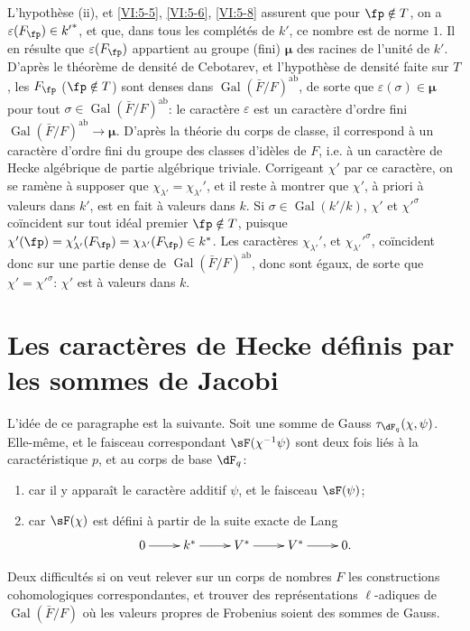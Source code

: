 \documentclass[oneside]{book}
\DeclareMathOperator{\gal}{Gal}
\newcommand{\dmu}{{\bm\mu}}
\theoremstyle{sga-source}
\theoremstyle{sga-source-dash}
\theoremstyle{sga-source-dotdash}
\theoremstyle{sga-source-number-note-dash}
\theoremstyle{sga-source-note-number-dotdash}
\theoremstyle{sga-source-example-dotdash}
\theoremstyle{sga-source-inline-number}
\theoremstyle{sga-source-bare-number}
\theoremstyle{sga-source}
\newcommand{\PrintPage}[1]{}\newcommand{\MathPage}[1]{}\newcommand{\PrintCite}[2]{#1}\newcommand{\var}[3]{#2}
\begin{document}
L'hypothèse (ii), et \ref{VI:5-5}, \ref{VI:5-6}, \ref{VI:5-8} assurent que 
pour $\fp\notin T$, on a $\varepsilon(F_\fp)\in {k'}^\ast$, et que, dans tous 
les complétés de $k'$, ce nombre est de norme $1$. Il en résulte que 
$\varepsilon(F_\fp)$ appartient au \var{groupe (fini) $\dmu$ racines}{groupe (fini) $\dmu$ des racines}{S45-SOL-0884} de l'unité 
de $k'$. D'après le théorème de densité de Cebotarev, et l'hypothèse 
de densité faite sur $T$, les $F_\fp$ ($\fp\notin T$) sont denses dans 
$\gal(\bar F/F)^\text{ab}$, de sorte que $\varepsilon(\sigma)\in \dmu$ pour tout 
$\sigma\in \gal(\bar F/F)^\text{ab}$: le caractère $\varepsilon$ est un 
caractère d'ordre fini $\gal(\bar F/F)^\text{ab}\to \dmu$. D'après la 
théorie du corps de classe, il correspond à un caractère d'ordre fini 
du groupe des classes d'idèles de $F$, i.e. à un caractère de Hecke 
algébrique de partie algébrique triviale. Corrigeant $\chi'$ par ce 
caractère, on se ramène à supposer que 
$\chi_{\lambda'}=\chi_{\lambda'}'$,  et il reste à montrer que $\chi'$, à 
priori à valeurs dans $k'$, est en fait à valeurs dans $k$. Si 
$\sigma\in \gal(k'/k)$, $\chi'$ et ${\chi'}^\sigma$ coïncident sur tout idéal 
premier $\fp\notin T$, puisque 
$\chi'(\fp) = \chi'_{\lambda'}(F_\fp) = \chi_{\lambda'}(F_\fp) \in k^\ast$. 
Les caractères $\chi_{\lambda'}'$, et ${\chi_{\lambda'}'}^\sigma$, coïncident 
donc sur une partie dense de $\gal(\bar F/F)^\text{ab}$, donc sont égaux, de 
sorte que $\chi'={\chi'}^\sigma$: $\chi'$ est à valeurs dans $k$. 










\PrintPage{213}
\section{Les caractères de Hecke définis par les sommes de Jacobi}\label{VI:6}

L'idée de ce paragraphe est la suivante. Soit une somme de Gauss 
$\tau_{\dF_q}(\chi,\psi)$. Elle-même, et le faisceau correspondant 
$\sF(\chi^{-1}\psi)$ sont deux fois liés à la caractéristique $p$, et au 
corps de base $\dF_q$: 
\begin{enumerate}[\indent a)]
  \item car il y appara\^it le caractère additif $\psi$, et le faisceau 
    $\sF(\psi)$; 
  \item car $\sF(\chi)$ est défini à partir de la suite exacte de Lang 
    \[\xymatrix{
      0 \ar[r] 
        & k^\ast \ar[r] 
        & V^\ast \ar[r] 
        & V^\ast \ar[r] 
        & 0 \text{.} 
    }\]
\end{enumerate}
Deux difficultés si on veut relever sur un corps de nombres $F$ les 
constructions cohomologiques correspondantes, et trouver des 
représentations $\ell$-adiques de $\gal(\bar F/F)$ où les valeurs propres 
de Frobenius soient des sommes de Gauss. 
\end{document}
